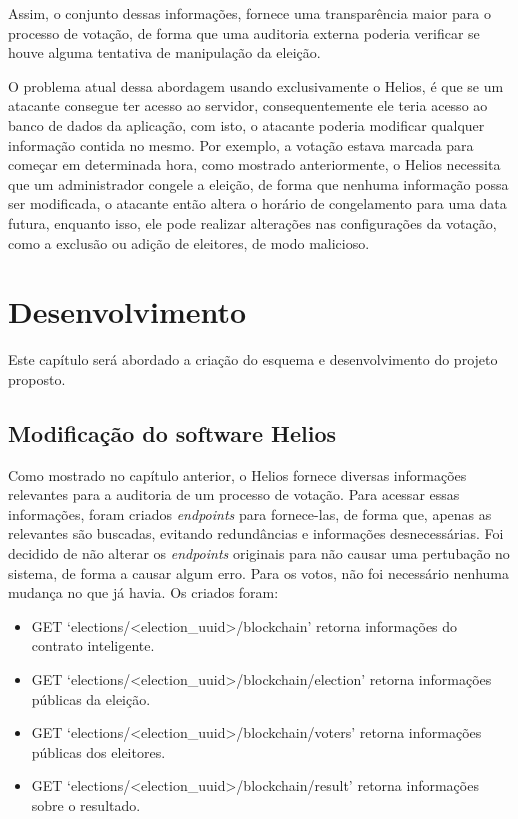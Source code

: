 \documentclass{ufsctex/ufsctex}
\begin{document}
Assim, o conjunto dessas informações, fornece uma transparência maior para o
processo de votação, de forma que uma auditoria externa poderia verificar se
houve alguma tentativa de manipulação da eleição. 

O problema atual dessa abordagem usando exclusivamente o Helios, é que se um
atacante consegue ter acesso ao servidor, consequentemente ele teria acesso ao
banco de dados da aplicação, com isto, o atacante poderia modificar qualquer
informação contida no mesmo. Por exemplo, a votação estava marcada para começar
em determinada hora, como mostrado anteriormente, o Helios necessita que um
administrador congele a eleição, de forma que nenhuma informação possa ser
modificada, o atacante então altera o horário de congelamento para uma data
futura, enquanto isso, ele pode realizar alterações nas configurações da
votação, como a exclusão ou adição de eleitores, de modo malicioso.

\chapter{Desenvolvimento}

Este capítulo será abordado a criação do esquema e desenvolvimento do projeto
proposto.

\section{Modificação do software Helios} 

Como mostrado no capítulo anterior, o Helios fornece diversas informações
relevantes para a auditoria de um processo de votação. Para acessar essas
informações, foram criados \textit{endpoints} para fornece-las, de forma que,
apenas as relevantes são buscadas, evitando redundâncias e informações
desnecessárias. Foi decidido de não alterar os \textit{endpoints} originais
para não causar uma pertubação no sistema, de forma a causar algum erro. Para
os votos, não foi necessário nenhuma mudança no que já havia. Os criados foram:

\begin{itemize}
	\item GET `elections/<election\_uuid>/blockchain' retorna 
		informações do contrato inteligente.
	\item GET `elections/<election\_uuid>/blockchain/election' retorna 
		informações públicas da eleição.
	\item GET `elections/<election\_uuid>/blockchain/voters' retorna 
		informações públicas dos eleitores.
	\item GET `elections/<election\_uuid>/blockchain/result' retorna
		informações sobre o resultado.
\end{itemize}
\end{document}
